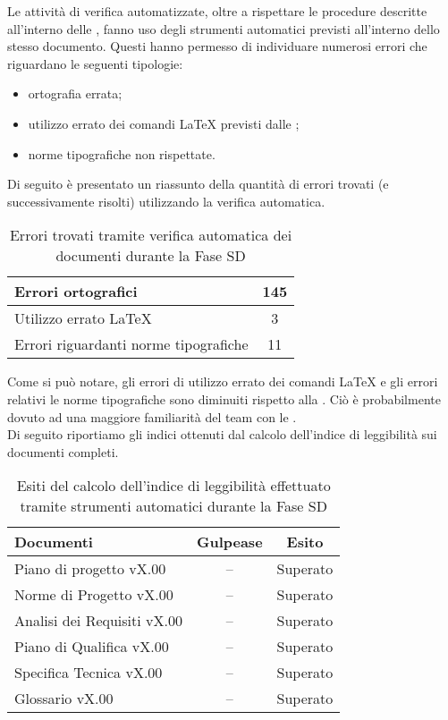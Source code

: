 			Le attività di verifica automatizzate, oltre a rispettare le procedure descritte all'interno delle , fanno uso degli strumenti automatici previsti all'interno dello stesso documento. Questi hanno permesso di individuare numerosi errori che riguardano le seguenti tipologie:
			\begin{itemize}
				\item ortografia errata;
				\item utilizzo errato dei comandi \LaTeX{} previsti dalle ;
				\item norme tipografiche non rispettate.
			\end{itemize}
			Di seguito è presentato un riassunto della quantità di errori trovati (e successivamente risolti) utilizzando la verifica automatica.
			\begin{table}[H]
					\centering
					\begin{tabu}{| l | c |}
						\hline
						Errori ortografici	&145	\\ \hline
						Utilizzo errato \LaTeX{}	&3	\\ \hline
						Errori riguardanti norme tipografiche	&11	\\ \hline
					\end{tabu}
					\caption{Errori trovati tramite verifica automatica dei documenti durante la Fase SD}
				\end{table}
				Come si può notare, gli errori di utilizzo errato dei comandi \LaTeX{} e gli errori relativi le norme tipografiche sono diminuiti rispetto alla . Ciò è probabilmente dovuto ad una maggiore familiarità del team con le \insdoc{Norme di Progetto}.\\
				Di seguito riportiamo gli indici ottenuti dal calcolo dell'indice di leggibilità sui documenti completi.
				\begin{table}[H]
					\centering
					\begin{tabu}{| l | c | c |}
							\hline
							Documenti 							& Gulpease	& Esito		\\ \hline \hline
							
							Piano di progetto vX.00				& -- 		& Superato  \\ \hline
							Norme di Progetto vX.00 			& --		& Superato  \\ \hline
							Analisi dei Requisiti vX.00	 	& --		& Superato  \\ \hline
							Piano di Qualifica vX.00 			& --		& Superato  \\ \hline
							Specifica Tecnica vX.00 			& --		& Superato  \\ \hline
							Glossario vX.00					 	& -- 		& Superato  \\ \hline
						\end{tabu}
					\caption{Esiti del calcolo dell'indice di leggibilità effettuato tramite strumenti automatici durante la Fase SD}
				\end{table}
